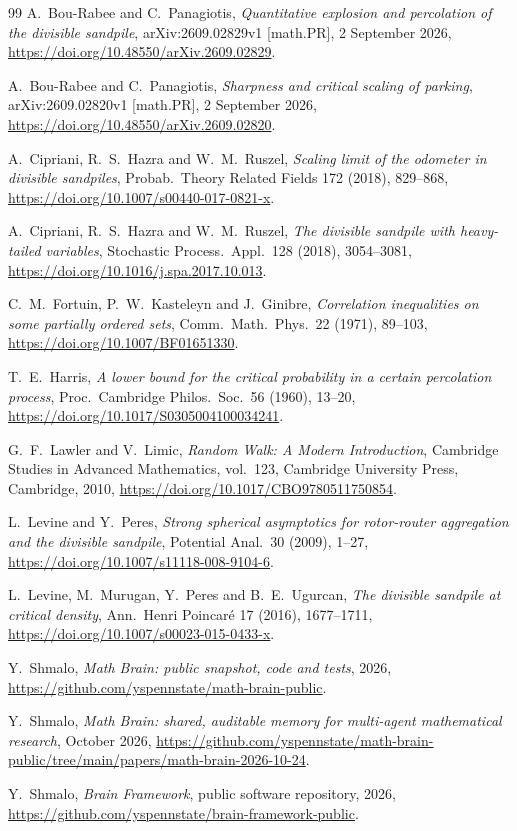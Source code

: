 \documentclass[11pt]{amsart}
\theoremstyle{remark}
\begin{document}
\begin{thebibliography}{99}
 A.~Bou-Rabee and C.~Panagiotis,
\emph{Quantitative explosion and percolation of the divisible sandpile},
arXiv:2609.02829v1 [math.PR], 2 September 2026,
\url{https://doi.org/10.48550/arXiv.2609.02829}.

 A.~Bou-Rabee and C.~Panagiotis,
\emph{Sharpness and critical scaling of parking},
arXiv:2609.02820v1 [math.PR], 2 September 2026,
\url{https://doi.org/10.48550/arXiv.2609.02820}.

 A.~Cipriani, R.~S.~Hazra and W.~M.~Ruszel,
\emph{Scaling limit of the odometer in divisible sandpiles},
Probab.\ Theory Related Fields 172 (2018), 829--868,
\url{https://doi.org/10.1007/s00440-017-0821-x}.

 A.~Cipriani, R.~S.~Hazra and W.~M.~Ruszel,
\emph{The divisible sandpile with heavy-tailed variables},
Stochastic Process.\ Appl.\ 128 (2018), 3054--3081,
\url{https://doi.org/10.1016/j.spa.2017.10.013}.

 C.~M.~Fortuin, P.~W.~Kasteleyn and J.~Ginibre,
\emph{Correlation inequalities on some partially ordered sets},
Comm.\ Math.\ Phys.\ 22 (1971), 89--103,
\url{https://doi.org/10.1007/BF01651330}.

 T.~E.~Harris,
\emph{A lower bound for the critical probability in a certain percolation process},
Proc.\ Cambridge Philos.\ Soc.\ 56 (1960), 13--20,
\url{https://doi.org/10.1017/S0305004100034241}.

 G.~F.~Lawler and V.~Limic,
\emph{Random Walk: A Modern Introduction},
Cambridge Studies in Advanced Mathematics, vol.~123,
Cambridge University Press, Cambridge, 2010,
\url{https://doi.org/10.1017/CBO9780511750854}.

 L.~Levine and Y.~Peres,
\emph{Strong spherical asymptotics for rotor-router aggregation and the divisible sandpile},
Potential Anal.\ 30 (2009), 1--27,
\url{https://doi.org/10.1007/s11118-008-9104-6}.

 L.~Levine, M.~Murugan, Y.~Peres and B.~E.~Ugurcan,
\emph{The divisible sandpile at critical density},
Ann.\ Henri Poincar\'e 17 (2016), 1677--1711,
\url{https://doi.org/10.1007/s00023-015-0433-x}.

 Y.~Shmalo, \emph{Math Brain: public snapshot, code and tests}, 2026, \url{https://github.com/yspennstate/math-brain-public}.

 Y.~Shmalo, \emph{Math Brain: shared, auditable memory for multi-agent mathematical research}, October 2026, \url{https://github.com/yspennstate/math-brain-public/tree/main/papers/math-brain-2026-10-24}.

 Y.~Shmalo, \emph{Brain Framework}, public software repository, 2026, \url{https://github.com/yspennstate/brain-framework-public}.

\end{thebibliography}
\end{document}
